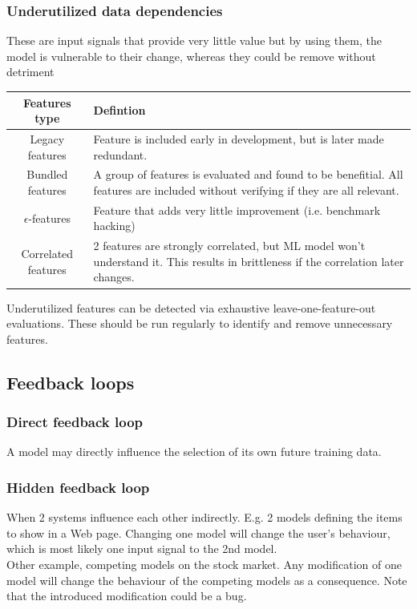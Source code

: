 \documentclass[../main.tex]{subfiles}
\begin{document}
\subsubsection{Underutilized data dependencies}
These are input signals that provide very little value
but by using them, the model is vulnerable to their change, whereas they could be remove
without detriment
\begin{center}
    \begin{tabular}{ |c|p{10cm}|}
        \hline
        Features type & Defintion \\
        \hline
        \hline
        Legacy features & Feature is included early in development, but is later made redundant. \\
        \hline
        Bundled features & A group of features is evaluated and found to be benefitial. All features
            are included without verifying if they are all relevant. \\
        \hline
        $\epsilon$-features & Feature that adds very little improvement (i.e. benchmark hacking) \\
        \hline
        Correlated features & 2 features are strongly correlated, but ML model won't understand it.
            This results in brittleness if the correlation later changes.\\
        \hline
    \end{tabular}
\end{center}

Underutilized features can be detected via exhaustive leave-one-feature-out evaluations. These should
be run regularly to identify and remove unnecessary features.

\subsection{Feedback loops}
\subsubsection{Direct feedback loop}
A model may directly influence the selection of its own future training data.

\subsubsection{Hidden feedback loop}
When 2 systems influence each other indirectly. E.g. 2 models defining the items to show in a Web
page. Changing one model will change the user's behaviour, which is most likely one input signal
to the 2nd model. \\
Other example, competing models on the stock market. Any modification of one model will change the
behaviour of the competing models as a consequence. Note that the introduced modification could be
a bug.
\end{document}
